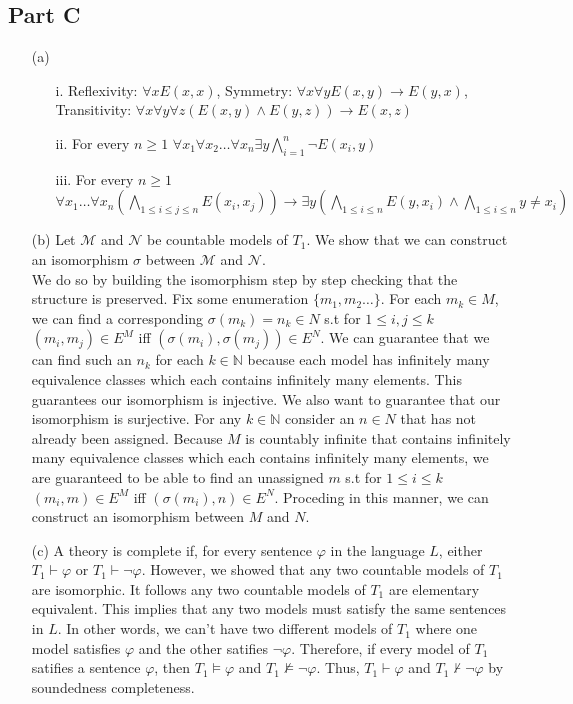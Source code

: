 \documentclass[10pt]{article}
\begin{document}
\subsection*{Part C}
\begin{itemize}
    \item [(a)]\begin{itemize}
        \item [i.] Reflexivity: $\forall x E(x,x)$, Symmetry: $\forall x\forall y E(x,y)\rightarrow E(y,x)$, Transitivity: $\forall x\forall y\forall z (E(x,y)\land E(y,z))\rightarrow E(x,z)$
        \item [ii.] For every $n\ge 1$ $\forall x_1\forall x_2\ldots\forall x_n\exists y\bigwedge_{i=1}^{n}\lnot E(x_i,y)$
        \item [iii.] For every $n\ge 1$ $\forall x_1\ldots\forall x_n(\underset{1\le i\le j\le n}{\bigwedge}E(x_i,x_j))\rightarrow\exists y(\underset{1\le i\le n}{\bigwedge}E(y,x_i)\land \underset{1\le i\le n}{\bigwedge}y\neq x_i)$
    \end{itemize}
    \item [(b)] Let $\mathcal{M}$ and $\mathcal{N}$ be countable models of $T_1$. 
    We show that we can construct an isomorphism $\sigma$ between $\mathcal{M}$ and $\mathcal{N}$.\\
    We do so by building the isomorphism step by step checking that the structure is preserved.
    Fix some enumeration $\{m_1,m_2\ldots\}$. 
    For each $m_k\in M$, we can find a corresponding $\sigma(m_k)=n_k\in N$ s.t for $1\le i,j\le k$ $(m_i,m_j)\in E^M$ iff $(\sigma(m_i),\sigma(m_j))\in E^N$. 
    We can guarantee that we can find such an $n_k$ for each $k\in\mathbb{N}$ because each model has infinitely many equivalence classes which each contains infinitely many elements. 
    This guarantees our isomorphism is injective.
    We also want to guarantee that our isomorphism is surjective. 
    For any $k\in \mathbb{N}$ consider an $n\in N$ that has not already been assigned. 
    Because $M$ is countably infinite that contains infinitely many equivalence classes which each contains infinitely many elements, we are guaranteed to be able to find an unassigned $m$ s.t for $1\le i\le k$ $(m_i,m)\in E^M$ iff $(\sigma(m_i),n)\in E^N$.
    Proceding in this manner, we can construct an isomorphism between $M$ and $N$.
    \item [(c)] A theory is complete if, for every sentence $\varphi$ in the language $L$, either $T_1\vdash\varphi$ or $T_1\vdash\lnot\varphi$.
    However, we showed that any two countable models of $T_1$ are isomorphic. It follows any two countable models of $T_1$ are elementary equivalent. 
    This implies that any two models must satisfy the same sentences in $L$. 
    In other words, we can't have two different models of $T_1$ where one model satisfies $\varphi$ and the other satifies $\lnot\varphi$.
    Therefore, if every model of $T_1$ satifies a sentence $\varphi$, then $T_1\models\varphi$ and $T_1\not\models\lnot\varphi$. Thus, $T_1\vdash\varphi$ and $T_1\not\vdash\lnot\varphi$ by soundedness completeness.
\end{itemize}
\end{document}

